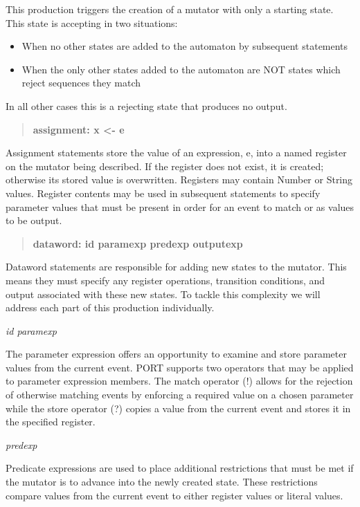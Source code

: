 \iffalse
This production triggers the creation of a mutator with only a starting
state.  This state is accepting in two situations:
\begin{itemize}
  \item{When no other states are added to the automaton by subsequent
    statements}
  \item{When the only other states added to the automaton are NOT states
    which reject sequences they match}
\end{itemize}
In all other cases this is a rejecting state that produces no output.


\begin{quote}
\centering
\textbf{assignment: x <- e}
\end{quote}

Assignment statements store the value of an expression, e, into a named
register on the mutator being described.
If the register does not exist,
it is created;
otherwise its stored value is overwritten.
Registers may contain Number or String values.  Register contents
may be used in subsequent statements to specify parameter values that must
be present in order for an event to match or as values to be output.



\begin{quote}
\centering
\textbf{dataword: id paramexp predexp outputexp}
\end{quote}


Dataword statements are responsible for adding new states to the
mutator.  This means they must specify any register operations,
transition conditions, and output associated with these new states.  To
tackle this complexity we will address each part of this production
individually.

\textit{id paramexp}

The parameter expression offers an opportunity to examine and store
parameter values from the current event.  PORT supports two operators
that may be applied to parameter expression members.  The match operator
(!) allows for the rejection of otherwise matching events
by enforcing a required value on a
chosen parameter while the store operator (?) copies a value from the
current event and stores it in the specified register.


\textit{predexp}

Predicate expressions are used to place additional restrictions that must
be met if the mutator is to advance into the newly created state.  These
restrictions compare values from the current event to either register
values or literal values.

